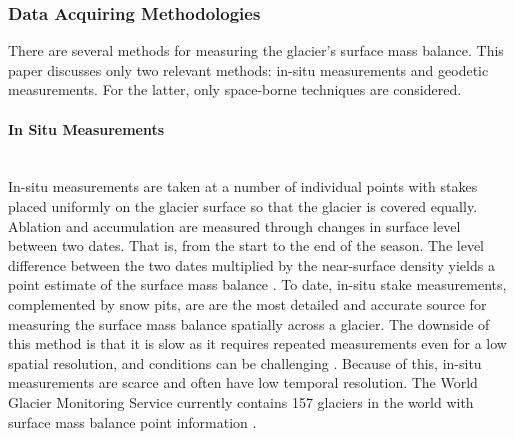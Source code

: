 \subsubsection{Data Acquiring Methodologies}
There are several methods for measuring the glacier's surface mass balance. This paper discusses only two relevant methods: in-situ measurements and geodetic measurements. For the latter, only space-borne techniques are considered.

\paragraph{In Situ Measurements}\mbox{}\vspace{2mm} \\ 
In-situ measurements are taken at a number of individual points with stakes placed uniformly on the glacier surface so that the glacier is covered equally. Ablation and accumulation are measured through changes in surface level between two dates. That is, from the start to the end of the season. The level difference between the two dates multiplied by the near-surface density yields a point estimate of the surface mass balance \cite{strem-1993}. To date, in-situ stake measurements, complemented by snow pits, are are the most detailed and accurate source for measuring the surface mass balance spatially across a glacier. The downside of this method is that it is slow as it requires repeated measurements even for a low spatial resolution, and conditions can be challenging \cite{kaser-2003}. Because of this, in-situ measurements are scarce and often have low temporal resolution. The World Glacier Monitoring Service currently contains 157 glaciers in the world with surface mass balance point information \cite{world-glacier-monitoring-service-2024}. 

